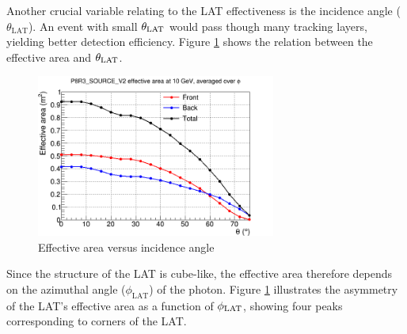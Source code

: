 Another crucial variable relating to the LAT effectiveness
is the incidence angle ($\theta_\text{LAT}$).
An event with small $\theta_{\rm LAT}$ would pass though many
tracking layers, yielding better detection efficiency.
Figure \ref{fig:eff_theta} shows
the relation between the effective area and $\theta_{\rm LAT}$.


\begin{figure}[h!]
    \centering
    \includegraphics[width=0.7\textwidth]{content/background/figures/eff_theta.png}
    \caption{
        Effective area versus incidence angle \citep{lat_p8_performance}
    }
    \label{fig:eff_theta}
\end{figure}

Since the structure of the LAT is cube-like, the effective area
therefore depends on the azimuthal angle
($\phi_\text{LAT}$) of the photon. Figure \ref{fig:eff_theta} illustrates
the asymmetry of the LAT's effective area as a function of
$\phi_{\rm LAT}$, showing four peaks corresponding to corners
of the LAT.


